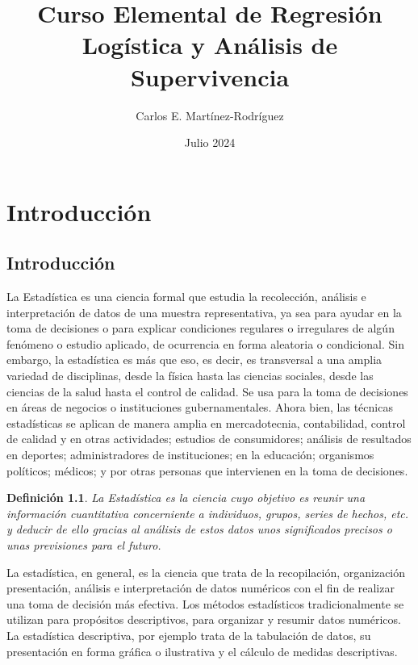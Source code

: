 \documentclass[a4paper]{report} %
\title{Curso Elemental de Regresión Logística y Análisis de Supervivencia}
\author{Carlos E. Martínez-Rodríguez}
\date{Julio 2024}
\newtheorem{Def}{Definición}[chapter]
\begin{document}
\maketitle

\tableofcontents
\chapter{Introducci\'on}

\section{Introducci\'on}

La Estad\'istica es una ciencia formal que estudia la recolecci\'on, an\'alisis e interpretaci\'on de datos de una muestra representativa, ya sea para ayudar en la toma de decisiones o para explicar condiciones regulares o irregulares de alg\'un fen\'omeno o estudio aplicado, de ocurrencia en forma aleatoria o condicional. Sin embargo, la estad\'istica es m\'as que eso, es decir, es transversal a una amplia variedad de disciplinas, desde la f\'isica hasta las ciencias sociales, desde las ciencias de la salud hasta el control de calidad. Se usa para la toma de decisiones en \'areas de negocios o instituciones gubernamentales. Ahora bien, las t\'ecnicas estad\'isticas se aplican de manera amplia en mercadotecnia, contabilidad, control de calidad y en otras actividades; estudios de consumidores; an\'alisis de resultados en deportes; administradores de instituciones; en la educaci\'on; organismos pol\'iticos; m\'edicos; y por otras personas que intervienen en la toma de decisiones.

\begin{Def}
    La Estad\'istica es la ciencia cuyo objetivo es reunir una informaci\'on cuantitativa concerniente a individuos, grupos, series de hechos, etc. y deducir de ello gracias al an\'alisis de estos datos unos significados precisos o unas previsiones para el futuro.
\end{Def}

La estad\'istica, en general, es la ciencia que trata de la recopilaci\'on, organizaci\'on presentaci\'on, an\'alisis e interpretaci\'on de datos num\'ericos con el fin de realizar una toma de decisi\'on m\'as efectiva. Los m\'etodos estad\'isticos tradicionalmente se utilizan para prop\'ositos descriptivos, para organizar y resumir datos num\'ericos. La estad\'istica descriptiva, por ejemplo trata de la tabulaci\'on de datos, su presentaci\'on en forma gr\'afica o ilustrativa y el c\'alculo de medidas descriptivas.
\end{document}
